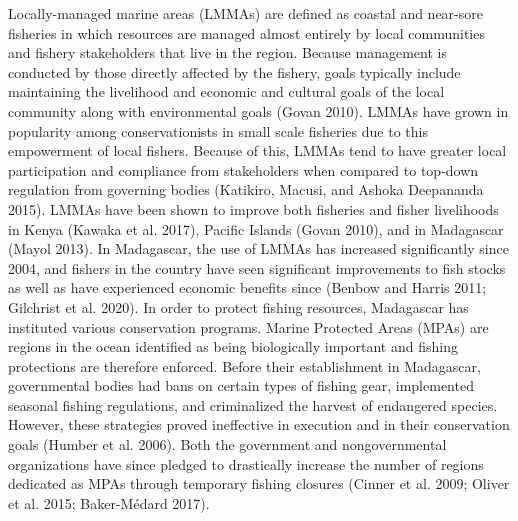 \documentclass[
]{article}
\begin{document}
Locally-managed marine areas (LMMAs) are defined as coastal and near-sore fisheries in which resources are managed almost entirely by local communities and fishery stakeholders that live in the region. Because management is conducted by those directly affected by the fishery, goals typically include maintaining the livelihood and economic and cultural goals of the local community along with environmental goals (Govan 2010). LMMAs have grown in popularity among conservationists in small scale fisheries due to this empowerment of local fishers. Because of this, LMMAs tend to have greater local participation and compliance from stakeholders when compared to top-down regulation from governing bodies (Katikiro, Macusi, and Ashoka Deepananda 2015). LMMAs have been shown to improve both fisheries and fisher livelihoods in Kenya (Kawaka et al. 2017), Pacific Islands (Govan 2010), and in Madagascar (Mayol 2013). In Madagascar, the use of LMMAs has increased significantly since 2004, and fishers in the country have seen significant improvements to fish stocks as well as have experienced economic benefits since (Benbow and Harris 2011; Gilchrist et al. 2020). In order to protect fishing resources, Madagascar has instituted various conservation programs. Marine Protected Areas (MPAs) are regions in the ocean identified as being biologically important and fishing protections are therefore enforced. Before their establishment in Madagascar, governmental bodies had bans on certain types of fishing gear, implemented seasonal fishing regulations, and criminalized the harvest of endangered species. However, these strategies proved ineffective in execution and in their conservation goals (Humber et al. 2006). Both the government and nongovernmental organizations have since pledged to drastically increase the number of regions dedicated as MPAs through temporary fishing closures (Cinner et al. 2009; Oliver et al. 2015; Baker-Médard 2017).
\end{document}
